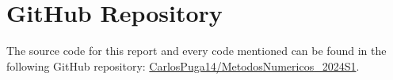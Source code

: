 \section{GitHub Repository}\label{sec:github}
 The source code for this report and every code mentioned can be found in the following GitHub repository: \href{https://github.com/CarlosPuga14/MetodosNumericos_2024S1}{CarlosPuga14/MetodosNumericos\_2024S1}.
